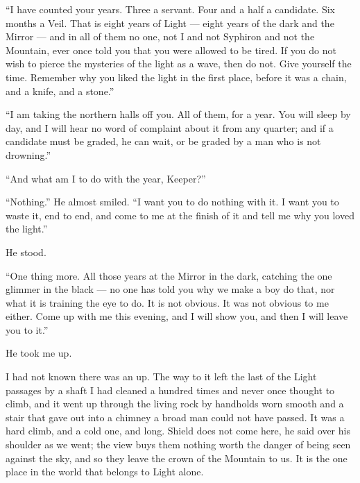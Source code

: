 ``I have counted your years. Three a servant. Four and a half a candidate. Six months a Veil. That is eight years of Light --- eight years of the dark and the Mirror --- and in all of them no one, not I and not Syphiron and not the Mountain, ever once told you that you were allowed to be tired. If you do not wish to pierce the mysteries of the light as a wave, then do not. Give yourself the time. Remember why you liked the light in the first place, before it was a chain, and a knife, and a stone.''\par

``I am taking the northern halls off you. All of them, for a year. You will sleep by day, and I will hear no word of complaint about it from any quarter; and if a candidate must be graded, he can wait, or be graded by a man who is not drowning.''\par

``And what am I to do with the year, Keeper?''\par

``Nothing.'' He almost smiled. ``I want you to do nothing with it. I want you to waste it, end to end, and come to me at the finish of it and tell me why you loved the light.''\par

He stood.\par

``One thing more. All those years at the Mirror in the dark, catching the one glimmer in the black --- no one has told you why we make a boy do that, nor what it is training the eye to do. It is not obvious. It was not obvious to me either. Come up with me this evening, and I will show you, and then I will leave you to it.''\par

He took me up.\par

I had not known there was an up. The way to it left the last of the Light passages by a shaft I had cleaned a hundred times and never once thought to climb, and it went up through the living rock by handholds worn smooth and a stair that gave out into a chimney a broad man could not have passed. It was a hard climb, and a cold one, and long. Shield does not come here, he said over his shoulder as we went; the view buys them nothing worth the danger of being seen against the sky, and so they leave the crown of the Mountain to us. It is the one place in the world that belongs to Light alone.\par

